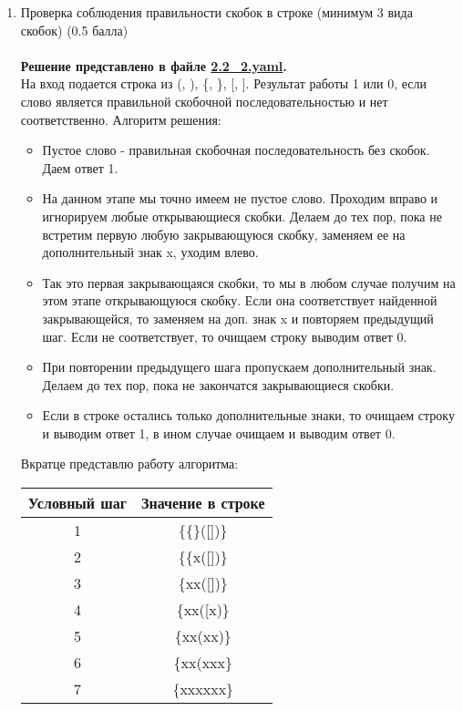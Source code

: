 \documentclass{article}
\begin{document}
\begin{enumerate}
    \item Проверка соблюдения правильности скобок в строке (минимум 3 вида скобок) (0.5 балла) \\ \\
    \textbf{Решение представлено в файле \href{https://github.com/NRU-MPEI-IMAI/tm-and-qc-s3tout/blob/main/TMV3/2.2_2.yaml}{2.2\_2.yaml}.} \\
    На вход подается строка из (, ), \{, \}, [, ]. Результат работы 1 или 0, если слово является правильной скобочной последовательностью и нет соответственно.
    Алгоритм решения:
    \begin{itemize}
        \item Пустое слово - правильная скобочная последовательность без скобок. Даем ответ 1. 
        \item На данном этапе мы точно имеем не пустое слово. Проходим вправо и игнорируем любые открывающиеся скобки. Делаем до тех пор, пока не встретим первую любую закрывающуюся скобку, заменяем ее на дополнительный знак x, уходим влево.
        \item Так это первая закрывающаяся скобки, то мы в любом случае получим на этом этапе открывающуюся скобку. Если она соответствует найденной закрывающейся, то заменяем на доп. знак x и повторяем предыдущий шаг. Если не соответствует, то очищаем строку выводим ответ 0. 
        \item При повторении предыдущего шага пропускаем дополнительный знак. Делаем до тех пор, пока не закончатся закрывающиеся скобки.
        \item Если в строке остались только дополнительные знаки, то очищаем строку и выводим ответ 1, в ином случае очищаем и выводим ответ 0. 
    \end{itemize}
    Вкратце представлю работу алгоритма: 
    \begin{center}
    \begin{tabular}{c|c}
        Условный шаг    & Значение в строке     \\ \hline
        1   & \{\{\}([])\}      \\
        2   & \{\{x([])\}       \\
        3   & \{xx([])\}        \\
        4   & \{xx([x)\}        \\
        5   & \{xx(xx)\}        \\
        6   & \{xx(xxx\}        \\
        7   & \{xxxxxx\}        \\

\end{tabular}
\end{center}
\end{enumerate}
\end{document}
